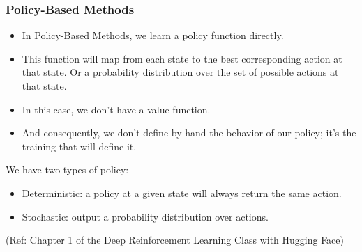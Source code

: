 \begin{frame}[fragile]\frametitle{Policy-Based Methods}

\begin{itemize}
\item In Policy-Based Methods, we learn a policy function directly.
\item This function will map from each state to the best corresponding action at that state. Or a probability distribution over the set of possible actions at that state.
\item  In this case, we don't have a value function.
\item And consequently, we don't define by hand the behavior of our policy; it's the training that will define it.
\end{itemize}

We have two types of policy:
\begin{itemize}
\item Deterministic: a policy at a given state will always return the same action.
\item Stochastic: output a probability distribution over actions.
\end{itemize}

{\tiny (Ref: Chapter 1 of the Deep Reinforcement Learning Class with Hugging Face)}


\end{frame}

